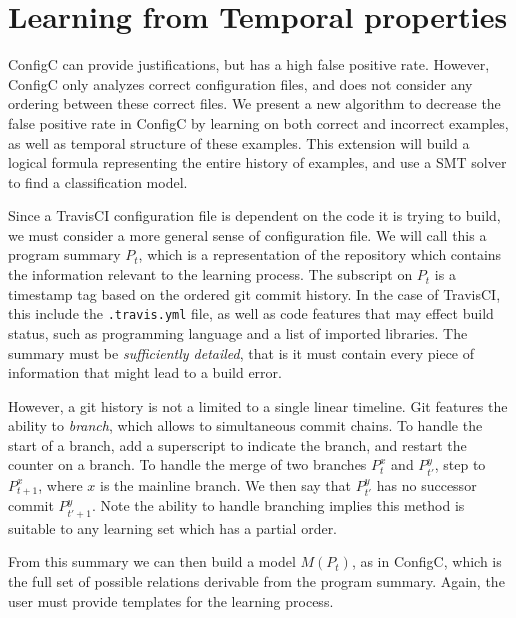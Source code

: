 \section{Learning from Temporal properties}


ConfigC can provide justifications, but has a high false positive rate.
However, ConfigC only analyzes correct configuration files, and does not consider any ordering between these correct files.
We present a new algorithm to decrease the false positive rate in ConfigC by learning on both correct and incorrect examples, as well as temporal structure of these examples.
This extension will build a logical formula representing the entire history of examples, and use a SMT solver to find a classification model.

Since a TravisCI configuration file is dependent on the code it is trying to build, we must consider a more general sense of configuration file.
We will call this a program summary $P_t$, which is a representation of the repository which contains the information relevant to the learning process.
The subscript on $P_t$ is a timestamp tag based on the ordered git commit history.
In the case of TravisCI, this include the \verb|.travis.yml| file, as well as code features that may effect build status, such as programming language and a list of imported libraries.
The summary must be \textit{sufficiently detailed}, that is it must contain every piece of information that might lead to a build error.

However, a git history is not a limited to a single linear timeline.
Git features the ability to \textit{branch}, which allows to simultaneous commit chains.
To handle the start of a branch, add a superscript to indicate the branch, and restart the counter on a branch.
To handle the merge of two branches $P_{t}^{x}$ and $P_{t'}^{y}$, step to $P_{t+1}^{x}$, where $x$ is the mainline branch.
We then say that $P_{t'}^{y}$ has no successor commit $P_{t'+1}^{y}$.
Note the ability to handle branching implies this method is suitable to any learning set which has a partial order.

From this summary we can then build a model $M(P_t)$, as in ConfigC, which is the full set of possible relations derivable from the program summary.
Again, the user must provide templates for the learning process.

